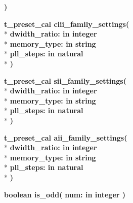 \begin{DoxyCompactItemize}
{\bfseries  )} 
\item 
{\bfseries {\bfseries \textcolor{vhdlchar}{t\+\_\+preset\+\_\+cal}\textcolor{vhdlchar}{ }}} {\bf ciii\+\_\+family\+\_\+settings}{\bfseries  ( }\\*
{\bfseries \textcolor{vhdlchar}{dwidth\+\_\+ratio\+: }\textcolor{stringliteral}{in }{\bfseries \textcolor{comment}{integer}\textcolor{vhdlchar}{ }}}\\*
{\bfseries \textcolor{vhdlchar}{memory\+\_\+type\+: }\textcolor{stringliteral}{in }{\bfseries \textcolor{comment}{string}\textcolor{vhdlchar}{ }}}\\*
{\bfseries \textcolor{vhdlchar}{pll\+\_\+steps\+: }\textcolor{stringliteral}{in }{\bfseries \textcolor{comment}{natural}\textcolor{vhdlchar}{ }}}\\*
{\bfseries  )} 
\item 
{\bfseries {\bfseries \textcolor{vhdlchar}{t\+\_\+preset\+\_\+cal}\textcolor{vhdlchar}{ }}} {\bf sii\+\_\+family\+\_\+settings}{\bfseries  ( }\\*
{\bfseries \textcolor{vhdlchar}{dwidth\+\_\+ratio\+: }\textcolor{stringliteral}{in }{\bfseries \textcolor{comment}{integer}\textcolor{vhdlchar}{ }}}\\*
{\bfseries \textcolor{vhdlchar}{memory\+\_\+type\+: }\textcolor{stringliteral}{in }{\bfseries \textcolor{comment}{string}\textcolor{vhdlchar}{ }}}\\*
{\bfseries \textcolor{vhdlchar}{pll\+\_\+steps\+: }\textcolor{stringliteral}{in }{\bfseries \textcolor{comment}{natural}\textcolor{vhdlchar}{ }}}\\*
{\bfseries  )} 
\item 
{\bfseries {\bfseries \textcolor{vhdlchar}{t\+\_\+preset\+\_\+cal}\textcolor{vhdlchar}{ }}} {\bf aii\+\_\+family\+\_\+settings}{\bfseries  ( }\\*
{\bfseries \textcolor{vhdlchar}{dwidth\+\_\+ratio\+: }\textcolor{stringliteral}{in }{\bfseries \textcolor{comment}{integer}\textcolor{vhdlchar}{ }}}\\*
{\bfseries \textcolor{vhdlchar}{memory\+\_\+type\+: }\textcolor{stringliteral}{in }{\bfseries \textcolor{comment}{string}\textcolor{vhdlchar}{ }}}\\*
{\bfseries \textcolor{vhdlchar}{pll\+\_\+steps\+: }\textcolor{stringliteral}{in }{\bfseries \textcolor{comment}{natural}\textcolor{vhdlchar}{ }}}\\*
{\bfseries  )} 
\item 
{\bfseries {\bfseries \textcolor{comment}{boolean}\textcolor{vhdlchar}{ }}} {\bf is\+\_\+odd}{\bfseries  ( }{\bfseries \textcolor{vhdlchar}{num\+: }\textcolor{stringliteral}{in }{\bfseries \textcolor{comment}{integer}\textcolor{vhdlchar}{ }}}{\bfseries  )} 

\end{DoxyCompactItemize}
